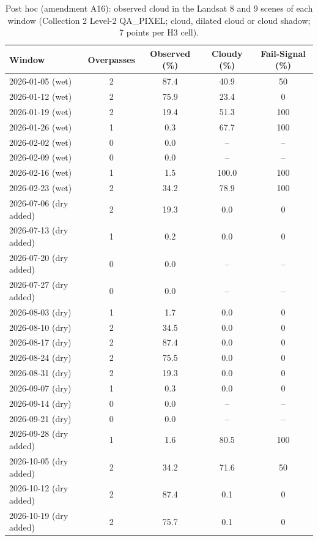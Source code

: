 \begin{table}[!t]
\centering
\footnotesize
\renewcommand{\arraystretch}{1.2}
\caption{Post hoc (amendment A16): observed cloud in the Landsat 8 and 9 scenes of each window (Collection 2 Level-2 QA\_PIXEL; cloud, dilated cloud or cloud shadow; 7 points per H3 cell).}
\label{tab:a16_landsat}
\begin{tabular}{|l|c|c|c|c|}
\hline
Window & Overpasses & Observed (\%) & Cloudy (\%) & Fail-Signal (\%) \\
\hline
2026-01-05 (wet) & 2 & 87.4 & 40.9 & 50 \\
\hline
2026-01-12 (wet) & 2 & 75.9 & 23.4 & 0 \\
\hline
2026-01-19 (wet) & 2 & 19.4 & 51.3 & 100 \\
\hline
2026-01-26 (wet) & 1 & 0.3 & 67.7 & 100 \\
\hline
2026-02-02 (wet) & 0 & 0.0 & -- & -- \\
\hline
2026-02-09 (wet) & 0 & 0.0 & -- & -- \\
\hline
2026-02-16 (wet) & 1 & 1.5 & 100.0 & 100 \\
\hline
2026-02-23 (wet) & 2 & 34.2 & 78.9 & 100 \\
\hline
2026-07-06 (dry added) & 2 & 19.3 & 0.0 & 0 \\
\hline
2026-07-13 (dry added) & 1 & 0.2 & 0.0 & 0 \\
\hline
2026-07-20 (dry added) & 0 & 0.0 & -- & -- \\
\hline
2026-07-27 (dry added) & 0 & 0.0 & -- & -- \\
\hline
2026-08-03 (dry) & 1 & 1.7 & 0.0 & 0 \\
\hline
2026-08-10 (dry) & 2 & 34.5 & 0.0 & 0 \\
\hline
2026-08-17 (dry) & 2 & 87.4 & 0.0 & 0 \\
\hline
2026-08-24 (dry) & 2 & 75.5 & 0.0 & 0 \\
\hline
2026-08-31 (dry) & 2 & 19.3 & 0.0 & 0 \\
\hline
2026-09-07 (dry) & 1 & 0.3 & 0.0 & 0 \\
\hline
2026-09-14 (dry) & 0 & 0.0 & -- & -- \\
\hline
2026-09-21 (dry) & 0 & 0.0 & -- & -- \\
\hline
2026-09-28 (dry added) & 1 & 1.6 & 80.5 & 100 \\
\hline
2026-10-05 (dry added) & 2 & 34.2 & 71.6 & 50 \\
\hline
2026-10-12 (dry added) & 2 & 87.4 & 0.1 & 0 \\
\hline
2026-10-19 (dry added) & 2 & 75.7 & 0.1 & 0 \\
\hline
\end{tabular}
\end{table}
